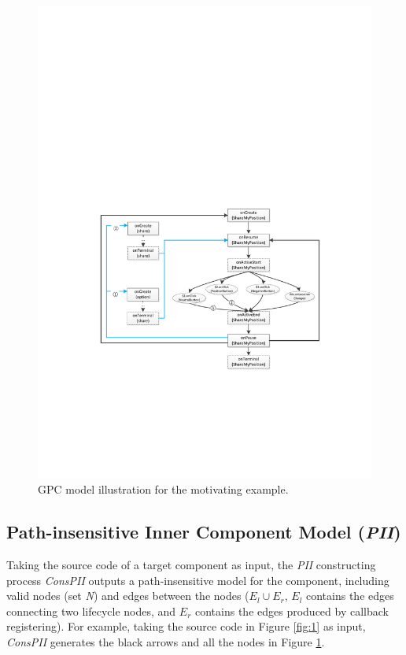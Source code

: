   \begin{figure}[t]%
  \centering
  \includegraphics[width=0.6\linewidth]{pic/motivationGPM.pdf}  
  \caption{GPC model illustration for the motivating example.}  
  \label{fig:motivationGPC} 
  \end{figure}

\subsection{Path-insensitive Inner Component Model (\textit{PII})}
Taking the source code of a target component as input, the \textit{PII} constructing process \textit{ConsPII} 
outputs a path-insensitive model for the component, including valid nodes (set \textit{N}) and edges between the nodes ($E_{l} \cup E_{r}$, $E_l$ contains the edges connecting two lifecycle nodes, and $E_r$ contains the edges produced by callback registering).
For example, taking the source code in Figure \ref{fig:1} as input, \textit{ConsPII} generates the black arrows and all the nodes in Figure \ref{fig:motivationGPC}. 

